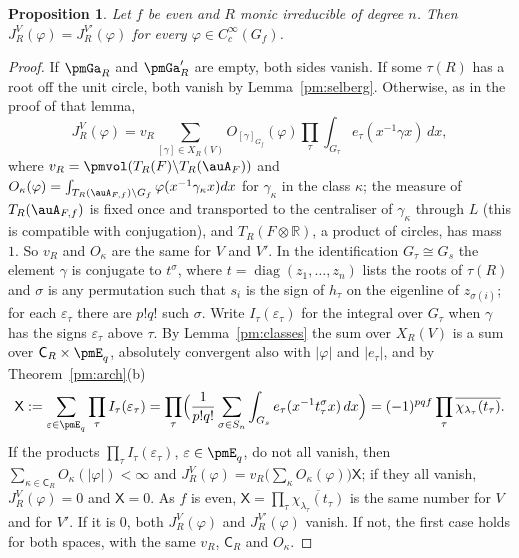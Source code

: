 \documentclass[10pt]{amsart}
\newtheorem{proposition}[theorem]{Proposition}
\theoremstyle{definition}
\theoremstyle{remark}
\newcommand{\R}{\mathbb R}
\providecommand{\aubar}[1]{\overline{#1}}
\begin{document}
\begin{proposition}\label{pm:ell}
Let $f$ be even and $R$ monic irreducible of degree $n$. Then
$J_R^V(\varphi)=J_R^{V'}(\varphi)$ for every $\varphi\in C_c^\infty(G_f)$.
\end{proposition}
\begin{proof}
If $\pmGa_R$ and $\pmGa'_R$ are empty, both sides vanish. If some $\tau(R)$ has a root off the
unit circle, both vanish by Lemma~\ref{pm:selberg}. Otherwise, as in the proof of that lemma,
\[
J_R^V(\varphi)=v_R\sum_{[\gamma]\in X_R(V)}O_{[\gamma]_{G_f}}(\varphi)\prod_{\tau}\int_{G_\tau}
e_\tau(x^{-1}\gamma x)\,dx,
\]
where $v_R=\pmvol(T_R(F)\backslash T_R(\auA_F))$ and $O_\kappa(\varphi)=\int_{T_R(\auA_{F,f})
\backslash G_f}\varphi(x^{-1}\gamma_\kappa x)dx$ for $\gamma_\kappa$ in the class $\kappa$; the
measure of $T_R(\auA_{F,f})$ is fixed once and transported to the centraliser of $\gamma_\kappa$
through $L$ (this is compatible with conjugation), and $T_R(F\otimes\R)$, a product of circles,
has mass $1$. So $v_R$ and $O_\kappa$ are the same for $V$ and $V'$. In the identification
$G_\tau\cong G_s$ the element $\gamma$ is conjugate to $t^\sigma$, where
$t=\operatorname{diag}(z_1,\dots,z_n)$ lists the roots of $\tau(R)$ and $\sigma$ is any
permutation such that $s_i$ is the sign of $h_\tau$ on the eigenline of $z_{\sigma(i)}$; for each
$\varepsilon_\tau$ there are $p!q!$ such $\sigma$. Write $I_\tau(\varepsilon_\tau)$ for the integral over $G_\tau$ when $\gamma$ has the signs
$\varepsilon_\tau$ above $\tau$. By Lemma~\ref{pm:classes} the sum over $X_R(V)$ is a sum over
$\mathsf C_R\times\pmE_q$, absolutely convergent also with $|\varphi|$ and $|e_\tau|$, and by
Theorem~\ref{pm:arch}(b)
\[
\mathsf X:=\sum_{\varepsilon\in\pmE_q}\prod_\tau I_\tau(\varepsilon_\tau)=\prod_\tau\Bigl(\frac1{p!q!}
\sum_{\sigma\in S_n}\int_{G_s}e_\tau(x^{-1}t_\tau^\sigma x)\,dx\Bigr)=(-1)^{pqf}\prod_\tau
\aubar{\chi_{\lambda_\tau}(t_\tau)} .
\]
If the products $\prod_\tau I_\tau(\varepsilon_\tau)$, $\varepsilon\in\pmE_q$, do not all vanish,
then $\sum_{\kappa\in\mathsf C_R}O_\kappa(|\varphi|)<\infty$ and $J_R^V(\varphi)=v_R\bigl(\sum_\kappa
O_\kappa(\varphi)\bigr)\mathsf X$; if they all vanish, $J_R^V(\varphi)=0$ and $\mathsf X=0$. As $f$
is even, $\mathsf X=\prod_\tau\aubar{\chi_{\lambda_\tau}(t_\tau)}$ is the same number for $V$ and
for $V'$. If it is $0$, both $J_R^V(\varphi)$ and $J_R^{V'}(\varphi)$ vanish. If not, the first case
holds for both spaces, with the same $v_R$, $\mathsf C_R$ and $O_\kappa$.
\end{proof}
\end{document}
